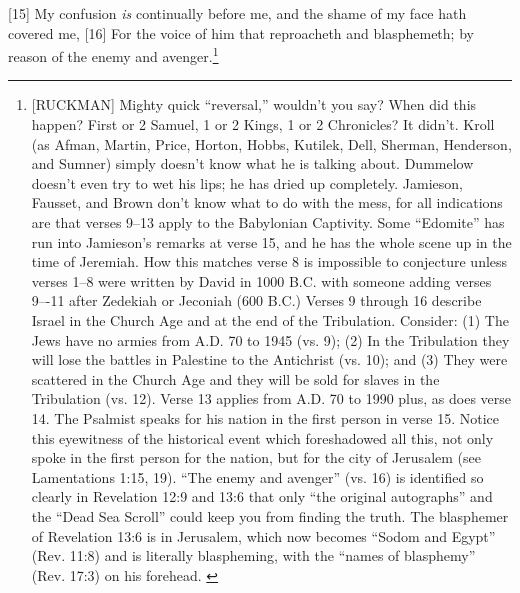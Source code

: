 [15] \textcolor[rgb]{0.00,0.00,1.00}{My confusion \emph{is} continually before me, and the shame of my face hath covered me,}
[16] \textcolor[rgb]{0.00,0.00,1.00}{For the voice of him that reproacheth and blasphemeth; by reason of the enemy and avenger.}\footnote{[RUCKMAN] Mighty quick “reversal,” wouldn’t you say? When did this happen? First or 2 Samuel, 1 or 2 Kings, 1 or 2 Chronicles? It didn’t. Kroll (as Afman, Martin, Price, Horton, Hobbs, Kutilek, Dell, Sherman, Henderson, and Sumner) simply doesn’t know what he is talking about. Dummelow doesn’t even try to wet his lips; he has dried up completely. Jamieson, Fausset, and Brown don’t know what to do with the mess, for all indications are that verses 9–13 apply to the Babylonian Captivity. Some “Edomite” has run into Jamieson’s remarks at verse 15, and he has the whole scene up in the time of Jeremiah. How this matches verse 8 is impossible to conjecture unless verses 1–8 were written by David in 1000 B.C. with someone adding verses 9–-11 after Zedekiah or Jeconiah (600 B.C.) Verses 9 through 16 describe Israel in the Church Age and at the end of the Tribulation. Consider: (1) The Jews have no armies from A.D. 70 to 1945 (vs. 9); (2) In the Tribulation they will lose the battles in Palestine to the Antichrist (vs. 10); and (3) They were scattered in the Church Age and they will be sold for slaves in the Tribulation (vs. 12). Verse 13 applies from A.D. 70 to 1990 plus, as does verse 14. The Psalmist speaks for his nation in the first person in verse 15. Notice this eyewitness of the historical event which foreshadowed all this, not only spoke in the first person for the nation, but for the city of Jerusalem (see Lamentations 1:15, 19). ``The enemy and avenger'' (vs. 16) is identified so clearly in Revelation 12:9 and 13:6 that only ``the original autographs'' and the ``Dead Sea Scroll'' could keep you from finding the truth. The blasphemer of Revelation 13:6 is in Jerusalem, which now becomes ``Sodom and Egypt'' (Rev. 11:8) and is literally blaspheming, with the ``names of blasphemy'' (Rev. 17:3) on his forehead. \cite{Ruckman1992Psalms} }
